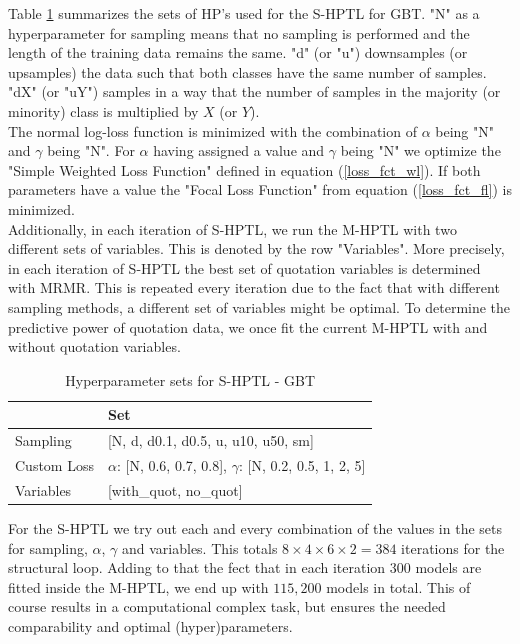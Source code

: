 \documentclass[12pt,titlepage]{article}
\begin{document}
Table \ref{shplgbm} summarizes the sets of HP's used for the S-HPTL for GBT. "N" as a hyperparameter for sampling means that no sampling is performed and the length of the training data remains the same. "d" (or "u") downsamples (or upsamples) the data such that both classes have the same number of samples. "dX" (or "uY") samples in a way that the number of samples in the majority (or minority) class is multiplied by $X$ (or $Y$). \\
The normal log-loss function is minimized with the combination of $\alpha$ being "N" and $\gamma$ being "N". For $\alpha$ having assigned a value and $\gamma$ being "N" we optimize the "Simple Weighted Loss Function" defined in equation (\ref{loss_fct_wl}). If both parameters have a value the "Focal Loss Function" from equation (\ref{loss_fct_fl}) is minimized. \\
Additionally, in each iteration of S-HPTL, we run the M-HPTL with two different sets of variables. This is denoted by the row "Variables". More precisely, in each iteration of S-HPTL the best set of quotation variables is determined with MRMR. This is repeated every iteration due to the fact that with different sampling methods, a different set of variables might be optimal. To determine the predictive power of quotation data, we once fit the current M-HPTL with and without quotation variables. \\
\begin{table}[H]
    \centering
    \begin{tabular}{|l|l|}
    \hline
              & Set  \\
    \hline
    Sampling &  [N, d, d0.1, d0.5, u, u10, u50, sm]  \\
    Custom Loss & $\alpha$: [N, 0.6, 0.7, 0.8], $\gamma$: [N, 0.2, 0.5, 1, 2, 5] \\
    Variables & [with\_quot, no\_quot] \\
    \hline
    \end{tabular}
    \caption{Hyperparameter sets for S-HPTL - GBT}
    \label{shplgbm}
\end{table}
\noindent
For the S-HPTL we try out each and every combination of the values in the sets for sampling, $\alpha$, $\gamma$ and variables. This totals $8\times4\times6\times2=384$ iterations for the structural loop. Adding to that the fect that in each iteration 300 models are fitted inside the M-HPTL, we end up with $115,200$ models in total. This of course results in a computational complex task, but ensures the needed comparability and optimal (hyper)parameters. \\
\end{document}
